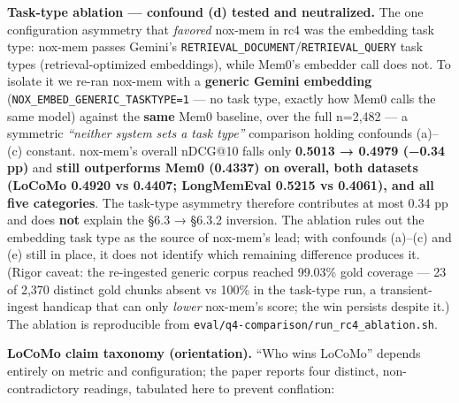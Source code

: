 \documentclass[
]{article}
\begin{document}
\textbf{Task-type ablation --- confound (d) tested and neutralized.} The
one configuration asymmetry that \emph{favored} nox-mem in rc4 was the
embedding task type: nox-mem passes Gemini's
\texttt{RETRIEVAL\_DOCUMENT}/\texttt{RETRIEVAL\_QUERY} task types
(retrieval-optimized embeddings), while Mem0's embedder call does not.
To isolate it we re-ran nox-mem with a \textbf{generic Gemini embedding}
(\texttt{NOX\_EMBED\_GENERIC\_TASKTYPE=1} --- no task type, exactly how
Mem0 calls the same model) against the \textbf{same} Mem0 baseline, over
the full n=2,482 --- a symmetric \emph{``neither system sets a task
type''} comparison holding confounds (a)--(c) constant. nox-mem's
overall nDCG@10 falls only \textbf{0.5013 → 0.4979 (−0.34 pp)} and
\textbf{still outperforms Mem0 (0.4337) on overall, both datasets
(LoCoMo 0.4920 vs 0.4407; LongMemEval 0.5215 vs 0.4061), and all five
categories}. The task-type asymmetry therefore contributes at most 0.34
pp and does \textbf{not} explain the §6.3 → §6.3.2 inversion. The
ablation rules out the embedding task type as the source of nox-mem's
lead; with confounds (a)--(c) and (e) still in place, it does not
identify which remaining difference produces it. (Rigor caveat: the
re-ingested generic corpus reached 99.03\% gold coverage --- 23 of 2,370
distinct gold chunks absent vs 100\% in the task-type run, a
transient-ingest handicap that can only \emph{lower} nox-mem's score;
the win persists despite it.) The ablation is reproducible from
\texttt{eval/q4-comparison/run\_rc4\_ablation.sh}.

\textbf{LoCoMo claim taxonomy (orientation).} ``Who wins LoCoMo''
depends entirely on metric and configuration; the paper reports four
distinct, non-contradictory readings, tabulated here to prevent
conflation:
\end{document}
